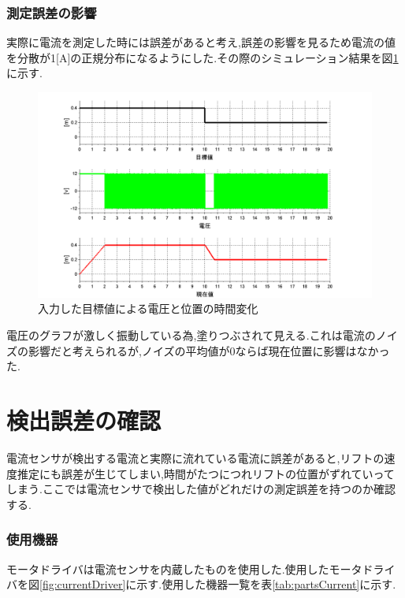 \subsubsection{測定誤差の影響}
実際に電流を測定した時には誤差があると考え,誤差の影響を見るため電流の値を分散が1[A]の正規分布になるようにした.その際のシミュレーション結果を図\ref{fig:sim}に示す.

\begin{figure}[htbp]
 \begin{center}
    \includegraphics[width=150mm]{img/sim2.bmp}
    \end{center}
  \caption{入力した目標値による電圧と位置の時間変化}
 \label{fig:sim}
\end{figure}

電圧のグラフが激しく振動している為,塗りつぶされて見える.これは電流のノイズの影響だと考えられるが,ノイズの平均値が0ならば現在位置に影響はなかった.

\section{検出誤差の確認}
電流センサが検出する電流と実際に流れている電流に誤差があると,リフトの速度推定にも誤差が生じてしまい,時間がたつにつれリフトの位置がずれていってしまう.ここでは電流センサで検出した値がどれだけの測定誤差を持つのか確認する.

\subsubsection{使用機器}
モータドライバは電流センサを内蔵したものを使用した.使用したモータドライバを図\ref{fig:currentDriver}に示す.使用した機器一覧を表\ref{tab:partsCurrent}に示す.

